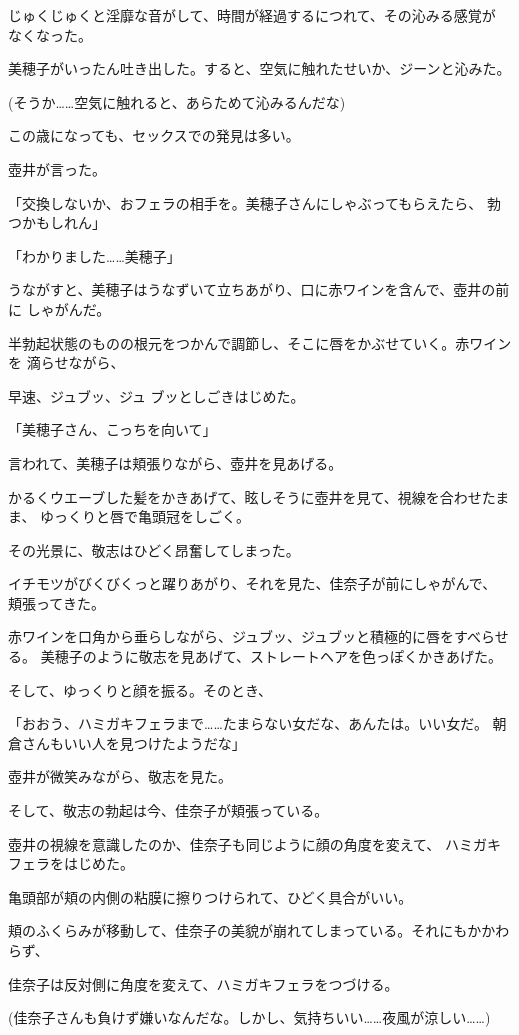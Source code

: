 ﻿\documentclass[
    book,tate,
    line_length=30zw,
    jafontsize=12pt,
    paper=b5j,
    landscape,
    ]{jlreq}
\begin{document}
じゅくじゅくと淫靡な音がして、時間が経過するにつれて、その沁みる感覚が
なくなった。

美穂子がいったん吐き出した。すると、空気に触れたせいか、ジーンと沁みた。

(そうか……空気に触れると、あらためて沁みるんだな)

この歳になっても、セックスでの発見は多い。

壺井が言った。

「交換しないか、おフェラの相手を。美穂子さんにしゃぶってもらえたら、
勃つかもしれん」

「わかりました……美穂子」

うながすと、美穂子はうなずいて立ちあがり、口に赤ワインを含んで、壺井の前に
しゃがんだ。

半勃起状態のものの根元をつかんで調節し、そこに唇をかぶせていく。赤ワインを
滴らせながら、

早速、ジュブッ、ジュ ブッとしごきはじめた。

「美穂子さん、こっちを向いて」

言われて、美穂子は頬張りながら、壺井を見あげる。

かるくウエーブした髪をかきあげて、眩しそうに壺井を見て、視線を合わせたまま、
ゆっくりと唇で亀頭冠をしごく。

その光景に、敬志はひどく昂奮してしまった。

イチモツがびくびくっと躍りあがり、それを見た、佳奈子が前にしゃがんで、
頬張ってきた。

赤ワインを口角から垂らしながら、ジュブッ、ジュブッと積極的に唇をすべらせる。
美穂子のように敬志を見あげて、ストレートヘアを色っぽくかきあげた。

そして、ゆっくりと顔を振る。そのとき、

「おおう、ハミガキフェラまで……たまらない女だな、あんたは。いい女だ。
朝倉さんもいい人を見つけたようだな」

壺井が微笑みながら、敬志を見た。

そして、敬志の勃起は今、佳奈子が頬張っている。

壺井の視線を意識したのか、佳奈子も同じように顔の角度を変えて、
ハミガキフェラをはじめた。

亀頭部が頬の内側の粘膜に擦りつけられて、ひどく具合がいい。

頬のふくらみが移動して、佳奈子の美貌が崩れてしまっている。それにもかかわらず、

佳奈子は反対側に角度を変えて、ハミガキフェラをつづける。

(佳奈子さんも負けず嫌いなんだな。しかし、気持ちいい……夜風が涼しい……)
\end{document}
